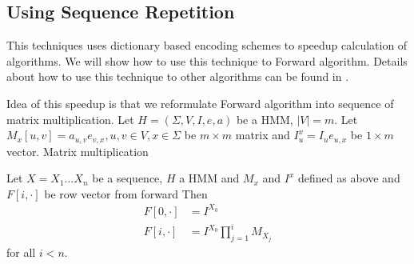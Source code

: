 %






\subsection{Using Sequence Repetition}

This techniques uses dictionary based encoding schemes to speedup calculation of
algorithms. We will show how to use this technique to Forward algorithm. Details
about how to use this technique to other algorithms can be found in
\cite{Lifshits2009}.


Idea of this speedup is that we reformulate Forward algorithm into sequence of
matrix multiplication.
Let $H=(\Sigma,V,I,e,a)$ be a HMM, $|V|=m$.  Let $M_x[u,v]=a_{u,v}e_{v,x},
u,v\in V,x\in \Sigma$ be $m\times m$ matrix and $I^x_u=I_ue_{u,x}$ be
$1\times m$ vector. Matrix multiplication

\begin{lemma}\label{LEMA:MATRIXMULTI}
Let $X=X_1\dots X_n$ be a sequence, $H$ a HMM and $M_x$ and $I^x$ defined as above and
$F[i,\cdot]$ be row vector from forward
Then
\begin{align}
F[0,\cdot] &= I^{X_0}\\
F[i,\cdot] &= I^{X_0}\prod_{j=1}^i M_{X_j}
\end{align}
for all $i< n$.
\end{lemma}

